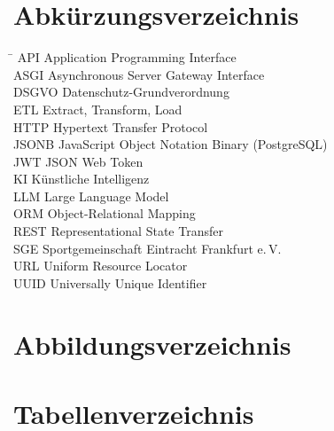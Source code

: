 \documentclass[11pt,a4paper,ngerman]{report}
\newcounter{savefrontpage}
\begin{document}
\chapter*{Abkürzungsverzeichnis}
\begin{tabbing}
\hspace{3.5cm} \= \kill
API       \> Application Programming Interface \\
ASGI      \> Asynchronous Server Gateway Interface \\
DSGVO     \> Datenschutz-Grundverordnung \\
ETL       \> Extract, Transform, Load \\
HTTP      \> Hypertext Transfer Protocol \\
JSONB     \> JavaScript Object Notation Binary (PostgreSQL) \\
JWT       \> JSON Web Token \\
KI        \> Künstliche Intelligenz \\
LLM       \> Large Language Model \\
ORM       \> Object-Relational Mapping \\
REST      \> Representational State Transfer \\
SGE       \> Sportgemeinschaft Eintracht Frankfurt e.\,V. \\
URL       \> Uniform Resource Locator \\
UUID      \> Universally Unique Identifier \\
\end{tabbing}

\chapter*{Abbildungsverzeichnis}
\makeatletter{}\makeatother

\chapter*{Tabellenverzeichnis}
\makeatletter{}\makeatother

\clearpage
\setcounter{savefrontpage}{\value{page}}



\end{document}
